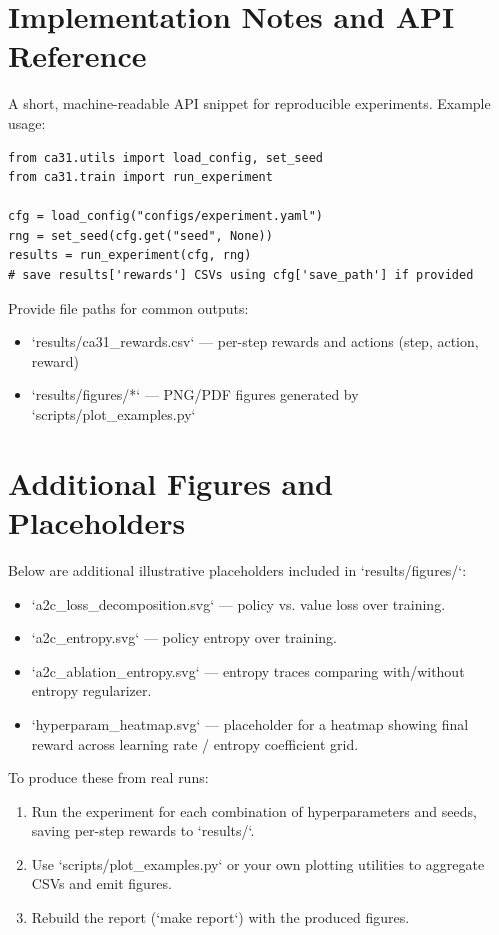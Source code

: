 \documentclass[11pt]{article}
\begin{document}
\section{Implementation Notes and API Reference}
A short, machine-readable API snippet for reproducible experiments. Example usage:
\begin{verbatim}
from ca31.utils import load_config, set_seed
from ca31.train import run_experiment

cfg = load_config("configs/experiment.yaml")
rng = set_seed(cfg.get("seed", None))
results = run_experiment(cfg, rng)
# save results['rewards'] CSVs using cfg['save_path'] if provided
\end{verbatim}

Provide file paths for common outputs:
\begin{itemize}
  \item `results/ca31_rewards.csv` — per-step rewards and actions (step, action, reward)
  \item `results/figures/*` — PNG/PDF figures generated by `scripts/plot_examples.py`
\end{itemize}

\section{Additional Figures and Placeholders}
Below are additional illustrative placeholders included in `results/figures/`:
\begin{itemize}
  \item `a2c_loss_decomposition.svg` — policy vs. value loss over training.
  \item `a2c_entropy.svg` — policy entropy over training.
  \item `a2c_ablation_entropy.svg` — entropy traces comparing with/without entropy regularizer.
  \item `hyperparam_heatmap.svg` — placeholder for a heatmap showing final reward across learning rate / entropy coefficient grid.
\end{itemize}

To produce these from real runs:
\begin{enumerate}
  \item Run the experiment for each combination of hyperparameters and seeds, saving per-step rewards to `results/`.
  \item Use `scripts/plot_examples.py` or your own plotting utilities to aggregate CSVs and emit figures.
  \item Rebuild the report (`make report`) with the produced figures.
\end{enumerate}
\end{document}
